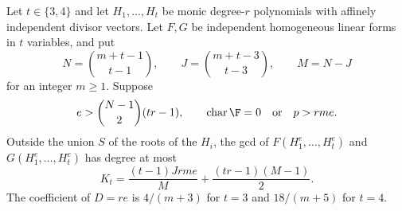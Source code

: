 \begin{lemma}\label{lem:power-family-gcd}
Let $t\in\{3,4\}$ and let $H_1,\ldots,H_t$ be monic degree-$r$
polynomials with affinely independent divisor vectors. Let $F,G$ be
independent homogeneous linear forms in $t$ variables, and put
\[
 N=\binom{m+t-1}{t-1},\qquad
 J=\binom{m+t-3}{t-3},\qquad M=N-J
\]
for an integer $m\ge1$. Suppose
\[
 e>\binom{N-1}{2}(tr-1),\qquad
 \operatorname{char}\F=0\quad\text{or}\quad p>rme.
\]
Outside the union $S$ of the roots of the $H_i$, the gcd of
$F(H_1^e,\ldots,H_t^e)$ and $G(H_1^e,\ldots,H_t^e)$ has degree at most
\begin{equation}\label{eq:power-family-K}
 K_t=\frac{(t-1)Jrme}{M}+\frac{(tr-1)(M-1)}2.
\end{equation}
The coefficient of $D=re$ is $4/(m+3)$ for $t=3$ and $18/(m+5)$
for $t=4$.
\end{lemma}


